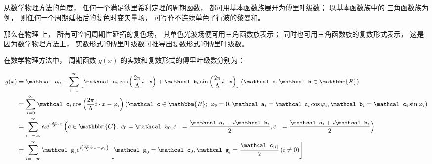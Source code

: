 从数学物理方法的角度， 任何一个满足狄里希利定理的周期函数， 都可用基本函数族展开为傅里叶级数； 以基本函数族中的
三角函数族为例， 则任何一个周期延拓后的复色时变矢量场， 可写作不连续单色子行波的黎曼和。 

那么在物理
上， 所有可空间周期性延拓的复色场， 其单色光波场便可用三角函数族表示； 同时也可用三角函数族的复数形式表示， 
这是因为数学物理方法上， 实数形式的傅里叶级数可推导出复数形式的傅里叶级数。 

在数学物理方法中， 周期函数 $ g(x) $ 
的实数和复数形式的傅里叶级数分别为：

\begin{theorem}
	\begin{equation}\small
		\begin{split}
				g(x) &= {{\mathcal a}_0} + \sum\limits_{i = 1}^\infty  {\left[ {{{\mathcal a}_i}\cos \left( {\frac{{2\pi }}{\Lambda}i \cdot x} \right) + {{\mathcal b}_i}\sin \left( {\frac{{2\pi }}{\Lambda}i \cdot x} \right)} \right]} \left( {{\mathcal a},{\mathcal b} \in \mathbbm{R} } \right) \\
				&= \sum\limits_{i = 0}^\infty {{{{\mathcal c}_i}\cos \left( {\frac{{2\pi }}{\Lambda}i \cdot x - \varphi_i } \right)}} \left( {{\mathcal c} \in \mathbbm{R} ;\ 
				\varphi_0 = 0 , {{\mathcal a}_i} = {{\mathcal c}_i}\cos \varphi_i, {{\mathcal b}_i} = {{\mathcal c}_i}\sin \varphi_i } \right) \\
				&= \sum\limits_{i = - \infty }^\infty  {{c_i}{e^{{\mathrm i} \frac{2\pi}{\Lambda} \cdot x}}} \left( {c \in \mathbbm{C};\ {c_0} = {{\mathcal a}_0},{c_ + } = \frac{{{{\mathcal a}_i} - i{{\mathcal b}_i}}}{2},{c_ - } = \frac{{{{\mathcal a}_i} + i{{\mathcal b}_i}}}{2}} \right) \\
				&= \sum\limits_{i = - \infty }^\infty  {{\mathcal g}_i {e^{{\mathrm i} \left( {\frac{{2\pi }}{\Lambda}i \cdot x - \varphi_i } \right)}}} \left[ {\mathcal g}_0 = {\mathcal c}_0 , {\mathcal g}_i = \frac{{\mathcal c}_{\left| i \right|}}{2} \left( i \neq 0 \right) \right]
		\end{split}
	\end{equation}
\end{theorem}

